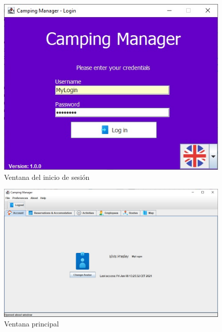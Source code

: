 \documentclass[a4paper]{article}
\begin{document}
\begin{figure}[h]
\includegraphics[width=\textwidth]{img/login.jpg}
\caption{Ventana del inicio de sesión}
\end{figure}

\begin{figure}[h]
\includegraphics[width=\textwidth]{img/account.jpg}
\caption{Ventana principal}
\end{figure}
\end{document}
